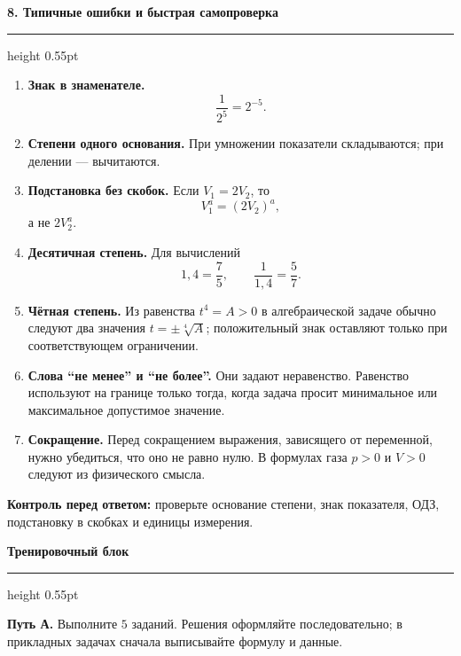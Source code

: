 \documentclass[a4paper,12pt]{article}
\newcommand{\keyidea}[1]{\textbf{\color{darkaccent}#1}}
\newcommand{\lessonsection}[1]{%
  \vspace{0.35em}%
  {\Large\bfseries\color{darkaccent}#1\par}%
  \vspace{0.22em}%
  {\color{accent!55}\hrule height 0.55pt}%
  \vspace{0.6em}%
}
\begin{document}
\clearpage


\lessonsection{8. Типичные ошибки и быстрая самопроверка}

\begin{enumerate}
  \item \textbf{Знак в знаменателе.}
  \[
  \frac1{2^5}=2^{-5}.
  \]

  \item \textbf{Степени одного основания.}
  При умножении показатели складываются; при делении --- вычитаются.

  \item \textbf{Подстановка без скобок.}
  Если $V_1=2V_2$, то
  \[
  V_1^a=(2V_2)^a,
  \]
  а не $2V_2^a$.

  \item \textbf{Десятичная степень.}
  Для вычислений
  \[
  1{,}4=\frac75,
  \qquad
  \frac1{1{,}4}=\frac57.
  \]

  \item \textbf{Чётная степень.}
  Из равенства $t^4=A>0$ в алгебраической задаче обычно следуют два значения $t=\pm\sqrt[4]{A}$; положительный знак оставляют только при соответствующем ограничении.

  \item \textbf{Слова ``не менее'' и ``не более''.}
  Они задают неравенство. Равенство используют на границе только тогда, когда задача просит минимальное или максимальное допустимое значение.

  \item \textbf{Сокращение.}
  Перед сокращением выражения, зависящего от переменной, нужно убедиться, что оно не равно нулю. В формулах газа $p>0$ и $V>0$ следуют из физического смысла.
\end{enumerate}

\keyidea{Контроль перед ответом:}
проверьте основание степени, знак показателя, ОДЗ, подстановку в скобках и единицы измерения.


\clearpage

\lessonsection{Тренировочный блок}

\textbf{Путь А.} Выполните $5$ заданий. Решения оформляйте последовательно; в прикладных задачах сначала выписывайте формулу и данные.
\end{document}
